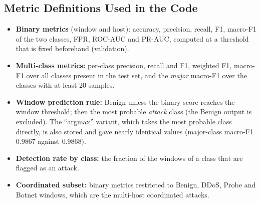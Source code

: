 \begin{appendices}
\section{Metric Definitions Used in the Code}
\begin{itemize}
	\item \textbf{Binary metrics} (window and host): accuracy, precision, recall, F1, macro-F1 of the two classes, FPR, ROC-AUC and PR-AUC, computed at a threshold that is fixed beforehand (validation).
	\item \textbf{Multi-class metrics:} per-class precision, recall and F1, weighted F1, macro-F1 over all classes present in the test set, and the \emph{major} macro-F1 over the classes with at least 20 samples.
	\item \textbf{Window prediction rule:} Benign unless the binary score reaches the window threshold; then the most probable \emph{attack} class (the Benign output is excluded). The ``argmax'' variant, which takes the most probable class directly, is also stored and gave nearly identical values (major-class macro-F1 0.9867 against 0.9868).
	\item \textbf{Detection rate by class:} the fraction of the windows of a class that are flagged as an attack.
	\item \textbf{Coordinated subset:} binary metrics restricted to Benign, DDoS, Probe and Botnet windows, which are the multi-host coordinated attacks.
\end{itemize}

\end{appendices}
